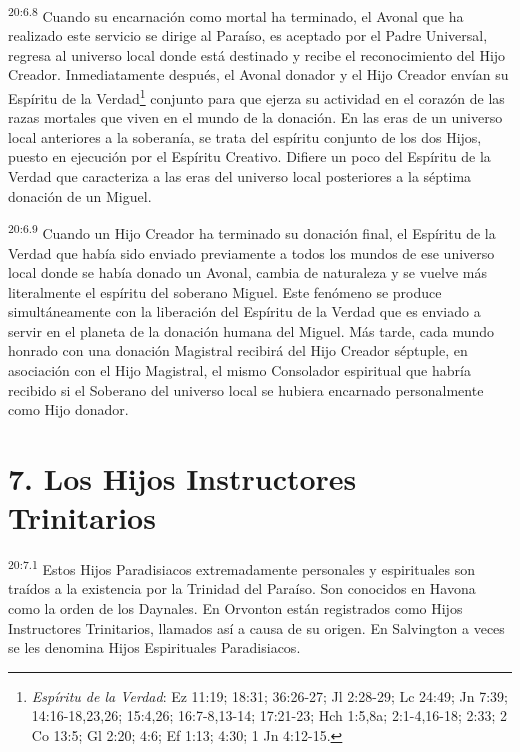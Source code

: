 \par
\textsuperscript{20:6.8} Cuando su encarnación como mortal ha terminado, el Avonal que ha realizado este servicio se dirige al Paraíso, es aceptado por el Padre Universal, regresa al universo local donde está destinado y recibe el reconocimiento del Hijo Creador. Inmediatamente después, el Avonal donador y el Hijo Creador envían su Espíritu de la Verdad\footnote{\textit{Espíritu de la Verdad}: Ez 11:19; 18:31; 36:26-27; Jl 2:28-29; Lc 24:49; Jn 7:39; 14:16-18,23,26; 15:4,26; 16:7-8,13-14; 17:21-23; Hch 1:5,8a; 2:1-4,16-18; 2:33; 2 Co 13:5; Gl 2:20; 4:6; Ef 1:13; 4:30; 1 Jn 4:12-15.} conjunto para que ejerza su actividad en el corazón de las razas mortales que viven en el mundo de la donación. En las eras de un universo local anteriores a la soberanía, se trata del espíritu conjunto de los dos Hijos, puesto en ejecución por el Espíritu Creativo. Difiere un poco del Espíritu de la Verdad que caracteriza a las eras del universo local posteriores a la séptima donación de un Miguel.

\par
\textsuperscript{20:6.9} Cuando un Hijo Creador ha terminado su donación final, el Espíritu de la Verdad que había sido enviado previamente a todos los mundos de ese universo local donde se había donado un Avonal, cambia de naturaleza y se vuelve más literalmente el espíritu del soberano Miguel. Este fenómeno se produce simultáneamente con la liberación del Espíritu de la Verdad que es enviado a servir en el planeta de la donación humana del Miguel. Más tarde, cada mundo honrado con una donación Magistral recibirá del Hijo Creador séptuple, en asociación con el Hijo Magistral, el mismo Consolador espiritual que habría recibido si el Soberano del universo local se hubiera encarnado personalmente como Hijo donador.

\section*{7. Los Hijos Instructores Trinitarios}
\par
\textsuperscript{20:7.1} Estos Hijos Paradisiacos extremadamente personales y espirituales son traídos a la existencia por la Trinidad del Paraíso. Son conocidos en Havona como la orden de los Daynales. En Orvonton están registrados como Hijos Instructores Trinitarios, llamados así a causa de su origen. En Salvington a veces se les denomina Hijos Espirituales Paradisiacos.

